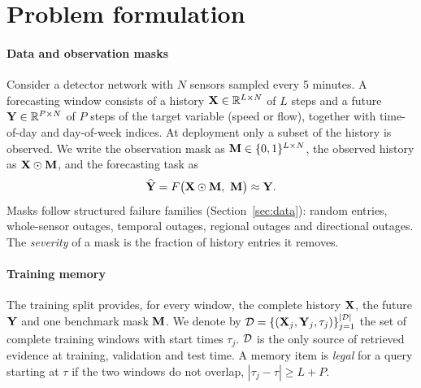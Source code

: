 \section{Problem formulation}
\label{sec:problem}

\paragraph{Data and observation masks}
Consider a detector network with $N$ sensors sampled every 5 minutes. A forecasting window consists of a history $\mathbf{X}\in\mathbb{R}^{L\times N}$ of $L$ steps and a future $\mathbf{Y}\in\mathbb{R}^{P\times N}$ of $P$ steps of the target variable (speed or flow), together with time-of-day and day-of-week indices. At deployment only a subset of the history is observed. We write the observation mask as $\mathbf{M}\in\{0,1\}^{L\times N}$, the observed history as $\mathbf{X}\odot\mathbf{M}$, and the forecasting task as
\begin{equation}
\widehat{\mathbf{Y}}=F\big(\mathbf{X}\odot\mathbf{M},\ \mathbf{M}\big)\approx\mathbf{Y} .
\label{eq:task}
\end{equation}
Masks follow structured failure families (Section~\ref{sec:data}): random entries, whole-sensor outages, temporal outages, regional outages and directional outages. The \emph{severity} of a mask is the fraction of history entries it removes.

\paragraph{Training memory}
The training split provides, for every window, the complete history $\mathbf{X}$, the future $\mathbf{Y}$ and one benchmark mask $\mathbf{M}$. We denote by $\mathcal{D}=\{(\mathbf{X}_j,\mathbf{Y}_j,\tau_j)\}_{j=1}^{|\mathcal{D}|}$ the set of complete training windows with start times $\tau_j$. $\mathcal{D}$ is the only source of retrieved evidence at training, validation and test time. A memory item is \emph{legal} for a query starting at $\tau$ if the two windows do not overlap, $|\tau_j-\tau|\geq L+P$.

